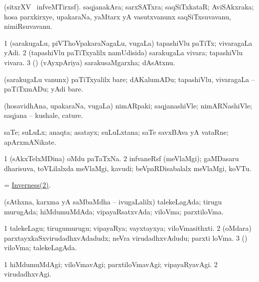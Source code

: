 \bentry
{}
\gl{\nA}
\bmng
(sitxrXV  \ucAcx\ infveMTirxsf). saqjanakAra; sarxSATxra; saqSiTxkataR; AviSAkxraka; hosa parxkirxye, upakaraNa, yaMtarx yA vasutxvanunx saqSiTxsuvavanu, nimiRsuvavanu. 
\emng
\eentry

\bentry
{}
\gl{\nA}
\bmng
\bnum
\num{1} (sarakugaLu, piVThoVpakaraNagaLu, \mo vugaLa) tapashiVlu paTiTx; vivaragaLa yAdi. 
\num{2} (tapashiVlu paTiTxyalilx namUdisida) sarakugaLa vivara; tapashiVlu vivara. 
\num{3} (\ame) (vAyxpAriya) sarakusaMgarxha; dAsAtxnu. 
\enum
\emng
\eentry

\bentry
{}
\gl{\sakirx}
\bmng
(sarakugaLu \mo vanunx) paTiTxyalilx bare; dAKalumADu; tapashiVlu, vivaragaLa -- paTiTxmADu; yAdi bare. 
\emng
\eentry

\bentry
{}
\gl{\nA}
\bmng
(hosavidhAna, upakaraNa, \mo vugaLa) nimARpaki; saqjanashiVle; nimARNashiVle; saqjana -- kushale, cature. 
\emng
\eentry

\bentry
{}
\gl{\nA}
\bmng
saTe; suLuLx; anaqta; asatayx; suLuLxtana; saTe savxBAva yA vataRne; apArxmANikate. 
\emng
\eentry

\bentry
{}
\gl{\nA}
\bmng
\bnum
\num{1} (sAkxTelxMDina) oMdu paTaTxNa. 
\hypertarget{Inverness(2)}{} 
\num{2} infvaneRsf (meVlaMgi); gaMDasaru dharisuva, toVLilalxda meVlaMgi, kavudi; beVpaRDisabalalx meVlaMgi, koVTu. 
\enum
\emng

\noindent 
\gl{\pagu}
\bmng
{}  = \hyperlink{Inverness(2)}{Inverness(2)}. 
\emng
\eentry

\bentry
{}
\gl{\gu}
\bmng
(sAthxna, karxma yA saMbaMdha -- ivugaLalilx) talekeLagAda; tirugu murugAda; hiMdumuMdAda; vipayaRsatxvAda; viloVma; parxtiloVma. 
\emng
\eentry

\bentry
{}
\gl{\nA}
\bmng
\bnum
\num{1} talekeLagu; tirugumurugu; vipayaRya; vayxtayxya; viloVmasithxti. 
\num{2} (oMdara) parxtayxkaSxvirudadhxvAdadudx; neVra virudadhxvAdudu; parxti loVma. 
\num{3} (\ga) viloVma; talekeLagAda. 
\enum
\emng
\eentry

\bentry
{}
\gl{\kirxvi}
\bmng
\bnum
\num{1} hiMdumuMdAgi; viloVmavAgi; parxtiloVmavAgi; vipayaRyavAgi. 
\num{2} virudadhxvAgi. 
\enum
\emng
\eentry

